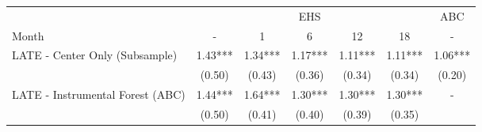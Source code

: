 \begin{tabular}{lcccccc}
\toprule 
\midrule 
 & \multicolumn{5}{c}{EHS} & ABC \\
 \cmidrule(lr){2-6} \cmidrule(lr){7-7} 
Month & - & 1 & 6 & 12 & 18 & - \\
\midrule 
LATE - Center Only (Subsample) & 1.43*** & 1.34*** & 1.17*** & 1.11*** & 1.11*** & 1.06*** \\
 & (0.50) & (0.43) & (0.36) & (0.34) & (0.34) & (0.20) \\
LATE - Instrumental Forest (ABC) & 1.44*** & 1.64*** & 1.30*** & 1.30*** & 1.30*** & - \\
 & (0.50) & (0.41) & (0.40) & (0.39) & (0.35) \\
\midrule 
\bottomrule 
\end{tabular}
